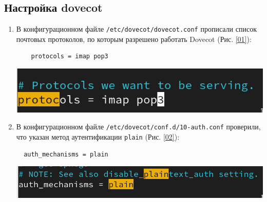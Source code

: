 \subsection{Настройка dovecot}
\begin{enumerate}
\item В конфигурационном файле \texttt{/etc/dovecot/dovecot.conf} прописали список почтовых протоколов, по которым разрешено работать Dovecot (Рис. \ref{01}):
  \begin{verbatim}
    protocols = imap pop3
  \end{verbatim}
\begin{center}
    \centering
    \includegraphics[width=\textwidth]{../images/image01.png}
    \label{01}
\end{center}

\item В конфигурационном файле \texttt{/etc/dovecot/conf.d/10-auth.conf} проверили, что указан метод аутентификации \texttt{plain} (Рис. \ref{02}):
\begin{verbatim}
  auth_mechanisms = plain
\end{verbatim}
\begin{center}
    \centering
    \includegraphics[width=\textwidth]{../images/image02.png}
    \label{02}
\end{center}


\end{enumerate}
